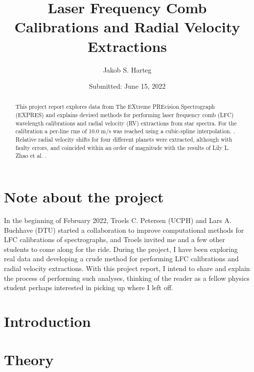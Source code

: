 \documentclass{article}
\author{Jakob S. Harteg}
\title{Laser Frequency Comb Calibrations and \newline Radial Velocity Extractions}
\subtitle{}
\date{Submitted: June 15, 2022}
\def\todo#1{\textbf{\footnotesize{\tcbox[colback=red!10]{todo: #1}}}}
\begin{document}
\begingroup
  \selectfont
  \maketitle
\endgroup


\newpage
\begin{abstract}
This project report explores data from The EXtreme PREcision Spectrograph (EXPRES) and explains devised methods for performing laser frequency comb (LFC) wavelength calibrations and radial velocity (RV) extractions from star spectra. For the calibration a per-line rms of 10.0 m/s was reached using a cubic-spline interpolation. \todo{Compare to Excalibur}. Relative radial velocity shifts for four different planets were extracted, although with faulty errors, and coincided within an order of magnitude with the results of Lily L. Zhao et al. \cite{yale_data}. 
\end{abstract}

\newpage
\tableofcontents

\vspace{\fill}

\section*{Note about the project}
In the beginning of February 2022, Troels C. Petersen (UCPH) and Lars A. Buchhave (DTU) started a collaboration to improve computational methods for LFC calibrations of spectrographs, and Troels invited me and a few other students to come along for the ride. During the project, I have been exploring real data and developing a crude method for performing LFC calibrations and radial velocity extractions. With this project report, I intend to share and explain the process of performing such analyses, thinking of the reader as a fellow physics student perhaps interested in picking up where I left off. 


\newpage
\section{Introduction}
 

\section{Theory}
 
\end{document}
